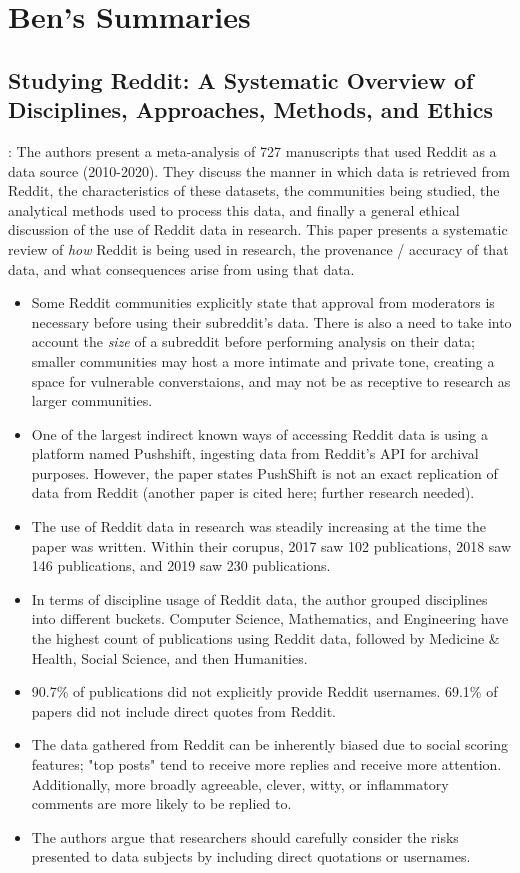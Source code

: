 \section{Ben's Summaries}
\subsection{Studying Reddit: A Systematic Overview of Disciplines, Approaches, Methods, and Ethics}
\cite{proferes-2021}: The authors present a meta-analysis of 727 manuscripts that used Reddit as a data source (2010-2020). They discuss the manner in which data is retrieved from Reddit, the characteristics of these datasets, the communities being studied, the analytical methods used to process this data, and finally a general ethical discussion of the use of Reddit data in research. This paper presents a systematic review of \textit{how} Reddit is being used in research, the provenance / accuracy of that data, and what consequences arise from using that data.
\begin{itemize}
  \item Some Reddit communities explicitly state that approval from moderators is necessary before using their subreddit's data. There is also a need to take into account the \textit{size} of a subreddit before performing analysis on their data; smaller communities may host a more intimate and private tone, creating a space for vulnerable converstaions, and may not be as receptive to research as larger communities.
  \item One of the largest indirect known ways of accessing Reddit data is using a platform named Pushshift, ingesting data from Reddit's API for archival purposes. However, the paper states PushShift is not an exact replication of data from Reddit (another paper is cited here; further research needed).
  \item The use of Reddit data in research was steadily increasing at the time the paper was written. Within their corupus, 2017 saw 102 publications, 2018 saw 146 publications, and 2019 saw 230 publications.
  \item In terms of discipline usage of Reddit data, the author grouped disciplines into different buckets. Computer Science, Mathematics, and Engineering have the highest count of publications using Reddit data, followed by Medicine \& Health, Social Science, and then Humanities.
  \item 90.7\% of publications did not explicitly provide Reddit usernames. 69.1\% of papers did not include direct quotes from Reddit. 
  \item The data gathered from Reddit can be inherently biased due to social scoring features; "top posts" tend to receive more replies and receive more attention. Additionally, more broadly agreeable, clever, witty, or inflammatory comments are more likely to be replied to.
  \item The authors argue that researchers should carefully consider the risks presented to data subjects by including direct quotations or usernames.
\end{itemize}

